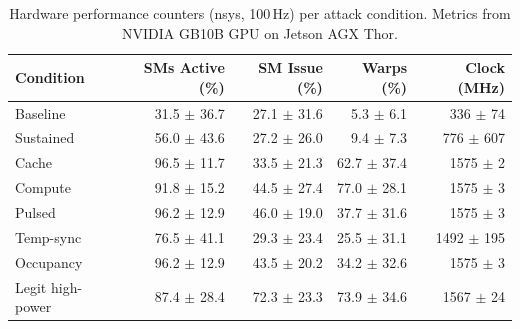 \begin{table}[t]
  \centering
  \caption{Hardware performance counters (nsys, 100\,Hz) per attack condition. Metrics from NVIDIA GB10B GPU on Jetson AGX Thor.}
  \label{tab:hw_counters}
  \small
  \begin{tabular}{lrrrr}
    \toprule
    Condition & SMs Active (\%) & SM Issue (\%) & Warps (\%) & Clock (MHz) \\
    \midrule
    Baseline & 31.5 $\pm$ 36.7 & 27.1 $\pm$ 31.6 & 5.3 $\pm$ 6.1 & 336 $\pm$ 74 \\
    Sustained & 56.0 $\pm$ 43.6 & 27.2 $\pm$ 26.0 & 9.4 $\pm$ 7.3 & 776 $\pm$ 607 \\
    Cache & 96.5 $\pm$ 11.7 & 33.5 $\pm$ 21.3 & 62.7 $\pm$ 37.4 & 1575 $\pm$ 2 \\
    Compute & 91.8 $\pm$ 15.2 & 44.5 $\pm$ 27.4 & 77.0 $\pm$ 28.1 & 1575 $\pm$ 3 \\
    Pulsed & 96.2 $\pm$ 12.9 & 46.0 $\pm$ 19.0 & 37.7 $\pm$ 31.6 & 1575 $\pm$ 3 \\
    Temp-sync & 76.5 $\pm$ 41.1 & 29.3 $\pm$ 23.4 & 25.5 $\pm$ 31.1 & 1492 $\pm$ 195 \\
    Occupancy & 96.2 $\pm$ 12.9 & 43.5 $\pm$ 20.2 & 34.2 $\pm$ 32.6 & 1575 $\pm$ 3 \\
    Legit high-power & 87.4 $\pm$ 28.4 & 72.3 $\pm$ 23.3 & 73.9 $\pm$ 34.6 & 1567 $\pm$ 24 \\
    \bottomrule
  \end{tabular}
\end{table}